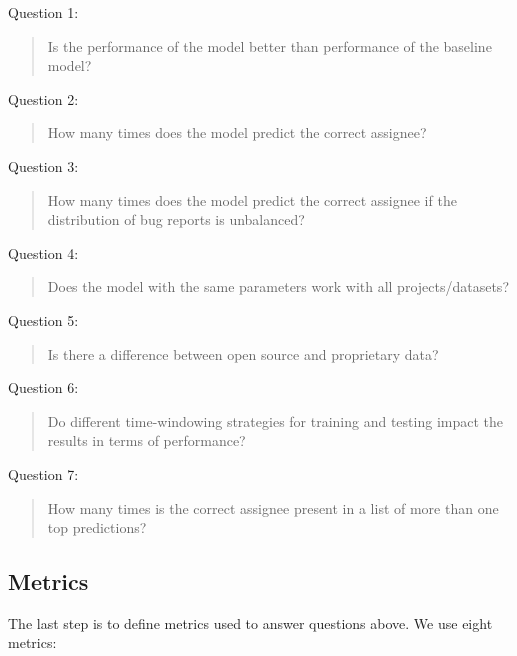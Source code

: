 \begin{framed}
  \hypertarget{question:1}{Question 1:}
  \begin{quote}
    Is the performance of the model better than performance of the baseline model?
  \end{quote}

  \hypertarget{question:2}{Question 2:}
  \begin{quote}
    How many times does the model predict the correct assignee?
  \end{quote}

  \hypertarget{question:3}{Question 3:}
  \begin{quote}
    How many times does the model predict the correct assignee if the distribution of bug reports is unbalanced?
  \end{quote}

  \hypertarget{question:4}{Question 4:}
  \begin{quote}
    Does the model with the same parameters work with all projects/datasets?
  \end{quote}

  \hypertarget{question:5}{Question 5:}
  \begin{quote}
    Is there a difference between open source and proprietary data?
  \end{quote}

  \hypertarget{question:6}{Question 6:}
  \begin{quote}
    Do different time-windowing strategies for training and testing impact the results in terms of performance?
  \end{quote}

  \hypertarget{question:7}{Question 7:}
  \begin{quote}
    How many times is the correct assignee present in a list of more than one top predictions?
  \end{quote}

\end{framed}

\subsection{Metrics}

The last step is to define metrics used to answer questions above. We use eight metrics:

